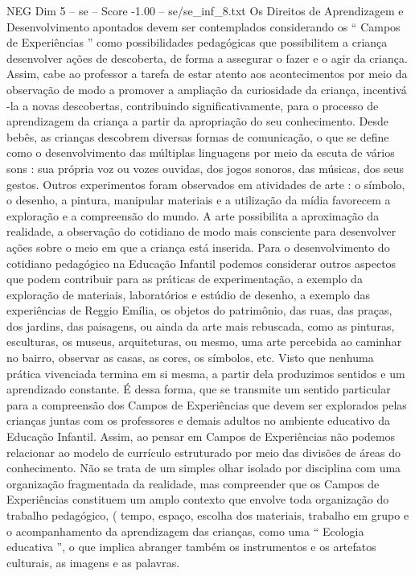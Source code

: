 \begin{textsample}{NEG Dim 5 – se – Score -1.00 – se/se\_inf\_8.txt}
Os Direitos de Aprendizagem e Desenvolvimento apontados devem ser contemplados considerando os “ Campos de Experiências ” como possibilidades pedagógicas que possibilitem a criança desenvolver ações de descoberta, de forma a assegurar o fazer e o agir da criança.
Assim, cabe ao professor a tarefa de estar atento aos acontecimentos por meio da observação de modo a promover a ampliação da curiosidade da criança, incentivá -la a novas descobertas, contribuindo significativamente, para o processo de aprendizagem da criança a partir da apropriação do seu conhecimento.
Desde bebês, as crianças descobrem diversas formas de comunicação, o que se define como o desenvolvimento das múltiplas linguagens por meio da escuta de vários sons : sua própria voz ou vozes ouvidas, dos jogos sonoros, das músicas, dos seus gestos.
Outros experimentos foram observados em atividades de arte : o símbolo, o desenho, a pintura, manipular materiais e a utilização da mídia favorecem a exploração e a compreensão do mundo.
A arte possibilita a aproximação da realidade, a observação do cotidiano de modo mais consciente para desenvolver ações sobre o meio em que a criança está inserida.
Para o desenvolvimento do cotidiano pedagógico na Educação Infantil podemos considerar outros aspectos que podem contribuir para as práticas de experimentação, a exemplo da exploração de materiais, laboratórios e estúdio de desenho, a exemplo das experiências de Reggio Emília, os objetos do patrimônio, das ruas, das praças, dos jardins, das paisagens, ou ainda da arte mais rebuscada, como as pinturas, esculturas, os museus, arquiteturas, ou mesmo, uma arte percebida ao caminhar no bairro, observar as casas, as cores, os símbolos, etc.
Visto que nenhuma prática vivenciada termina em si mesma, a partir dela produzimos sentidos e um aprendizado constante.
É dessa forma, que se transmite um sentido particular para a compreensão dos Campos de Experiências que devem ser explorados pelas crianças juntas com os professores e demais adultos no ambiente educativo da Educação Infantil.
Assim, ao pensar em Campos de Experiências não podemos relacionar ao modelo de currículo estruturado por meio das divisões de áreas do conhecimento.
Não se trata de um simples olhar isolado por disciplina com uma organização fragmentada da realidade, mas compreender que os Campos de Experiências constituem um amplo contexto que envolve toda organização do trabalho pedagógico, ( tempo, espaço, escolha dos materiais, trabalho em grupo e o acompanhamento da aprendizagem das crianças, como uma “ Ecologia educativa ”, o que implica abranger também os instrumentos e os artefatos culturais, as imagens e as palavras.

\end{textsample}

